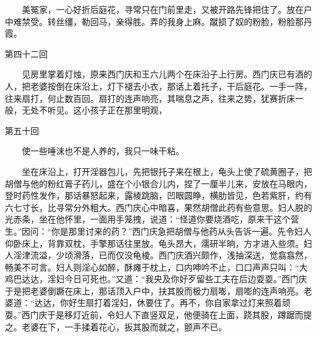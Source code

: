 　　美冤家，一心好折后庭花，寻常只在门前里走，又被开路先锋把住了。放在户中难禁受。转丝缰，勒回马，亲得胜。弄的我身上麻。蹴损了奴的粉脸，粉脸那丹霞。


第四十二回

　　见房里掌着灯烛，原来西门庆和王六儿两个在床沿子上行房。西门庆已有酒的人，把老婆按倒在床沿上，灯下褪去小衣，那话上着托子，干后庭花。一手一阵，往来扇打，何止数百回。扇打的连声响亮，其喘息之声，往来之势，犹赛折床一般，无处不听见。这小孩子正在那里明观，


第五十回

　　使一些唾沫也不是人养的，我只一味干粘。


　　坐在床沿上，打开淫器包儿，先把银托子来在根上，龟头上使了硫黄圈子，把胡僧与他的粉红膏子药儿，盛在个小银合儿内，捏了一厘半儿来，安放在马眼内，登时药性发作，那话暴怒起来，露棱跳脑，凹眼圆睁，横肋皆见，色若紫肝，约有六七寸长，比寻常分外粗大。西门庆心中暗喜，果然胡僧此药有些意思。妇人脱的光赤条，坐在他怀里，一面用手笼拽，说道：“怪道你要烧酒吃，原来干这个营生。”因问：“你是那里讨来的药？”西门庆急把胡僧与他药从头告诉一遍。先令妇人仰卧床上，背靠双枕，手擎那话往里放。龟头昂大，濡研半晌，方才进入些须。妇人淫津流溢，少顷滑落，已而仅没龟棱。西门庆酒兴颇作，浅抽深送，觉翕翕然，畅美不可言。妇人则淫心如醉，酥瘫于枕上，口内呻吟不止，口口声声只叫：“大鸡巴达达，淫妇今日可死也。”又道：“我央及你好歹留些工夫在后边耍耍。”西门庆于是把老婆倒蹶在床上，那话顶入户中，扶其股而极力扇嘭，扇嘭的连声响亮。老婆道：“达达，你好生扇打着淫妇，休要住了。再不，你自家拿过灯来照着顽耍。”西门庆于是移灯近前，令妇人下直竖双足，他便骑在上面，跷其股，蹲踞而提之。老婆在下，一手揉着花心，扳其股而就之，颤声不已。


